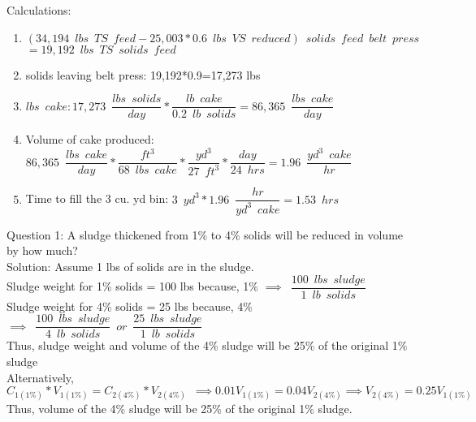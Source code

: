 \begin{enumerate}
\begin{enumerate}
Calculations:\\
\begin{enumerate}
\item $(34,194 \enspace lbs \enspace TS \enspace feed - 25,003*0.6 \enspace lbs \enspace VS \enspace reduced)\enspace solids \enspace feed \enspace belt \enspace press$\\
$=19,192 \enspace lbs \enspace TS \enspace solids \enspace feed$\\
\item solids leaving belt press: 19,192*0.9=17,273 lbs\\
\item $lbs \enspace cake: 17,273 \enspace \dfrac{lbs \enspace solids}{day}*\dfrac{lb \enspace cake}{0.2 \enspace lb \enspace solids}=86,365 \enspace \dfrac{lbs \enspace cake}{day}$\\
\item Volume of cake produced: $86,365 \enspace \dfrac{lbs \enspace cake}{day}*\dfrac{ft^3}{68 \enspace lbs \enspace cake}*\dfrac{yd^3}{27 \enspace ft^3}*\dfrac{day}{24 \enspace hrs} =1.96 \enspace \dfrac{yd^3 \enspace cake}{hr}$
\item Time to fill the 3 cu. yd bin: $3 \enspace yd^3 *1.96 \enspace \dfrac{hr}{yd^3 \enspace cake}=\boxed{1.53 \enspace hrs}$


\end{enumerate}

\end{enumerate}

Question 1: A sludge thickened from 1\% to 4\% solids will be reduced in volume by how much?\\
Solution:  Assume 1 lbs of solids are in the sludge.\\
Sludge weight for 1\% solids = 100 lbs because, 1\% $\implies \enspace \dfrac{100 \enspace lbs \enspace sludge}{1 \enspace lb \enspace solids}$\\
Sludge weight for 4\% solids = 25 lbs because, 4\% $\implies \enspace \dfrac{100 \enspace lbs \enspace sludge}{4 \enspace lb \enspace solids} \enspace or \enspace \dfrac{25 \enspace lbs \enspace sludge}{1 \enspace lb \enspace solids}$\\
Thus, sludge weight and volume of the 4\% sludge will be 25\% of the original 1\% sludge\\
\vspace{0.25cm}
Alternatively, $C_{1(1\%)}*V_{1(1\%)}=C_{2(4\%)}*V_{2(4\%)} \enspace \implies 0.01V_{1(1\%)}=0.04V_{2(4\%)} \implies V_{2(4\%)}=0.25V_{1(1\%)}$ \\
Thus, volume of the 4\% sludge will be 25\% of the original 1\% sludge.
\vspace{0.25cm}


\end{enumerate}

